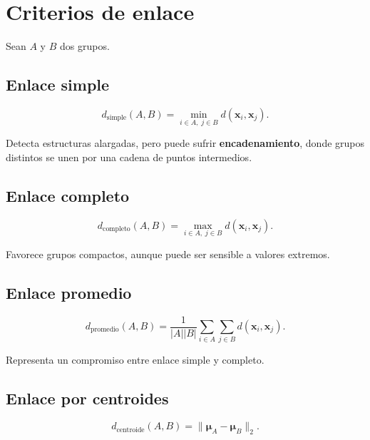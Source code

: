 \documentclass[
  spanish,
  10.5pt,
  letterpaper,
  DIV=11,
  numbers=noendperiod,
  oneside,
  open=any]{scrreprt}
\theoremstyle{definition}
\theoremstyle{definition}
\theoremstyle{plain}
\theoremstyle{remark}
\begin{document}
\section*{Criterios de enlace}\label{criterios-de-enlace}


Sean \(A\) y \(B\) dos grupos.

\subsection*{Enlace simple}\label{enlace-simple}

\[
d_{\text{simple}}(A,B)
=
\min_{i\in A,\;j\in B}
d(\mathbf{x}_i,\mathbf{x}_j).
\]

Detecta estructuras alargadas, pero puede sufrir
\textbf{encadenamiento}, donde grupos distintos se unen por una cadena
de puntos intermedios.

\subsection*{Enlace completo}\label{enlace-completo}

\[
d_{\text{completo}}(A,B)
=
\max_{i\in A,\;j\in B}
d(\mathbf{x}_i,\mathbf{x}_j).
\]

Favorece grupos compactos, aunque puede ser sensible a valores extremos.

\subsection*{Enlace promedio}\label{enlace-promedio}

\[
d_{\text{promedio}}(A,B)
=
\frac{1}{|A||B|}
\sum_{i\in A}
\sum_{j\in B}
d(\mathbf{x}_i,\mathbf{x}_j).
\]

Representa un compromiso entre enlace simple y completo.

\subsection*{Enlace por centroides}\label{enlace-por-centroides}

\[
d_{\text{centroide}}(A,B)
=
\|\boldsymbol{\mu}_A-\boldsymbol{\mu}_B\|_2.
\]
\end{document}
